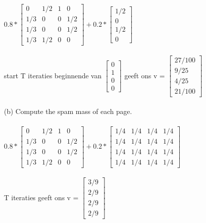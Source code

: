 \documentclass{exam}
\begin{document}
\begin{questions}
$0.8 *  \begin{bmatrix}0 & 1/2 & 1 & 0 \\ 
1/3 & 0 & 0 & 1/2 \\ 
1/3 & 0 & 0 & 1/2 \\ 
1/3 & 1/2 & 0 & 0 \end{bmatrix} + 0.2*\begin{bmatrix} 1/2 \\ 
0 \\ 
1/2 \\
0 \end{bmatrix}$\\\\
start T iteraties beginnende van $\begin{bmatrix} 0 \\ 
1 \\ 
0 \\
0 \end{bmatrix}$ geeft ons v = $\begin{bmatrix}  27/100 \\ 9/25 \\ 4/25 \\ 21/100 \end{bmatrix}$\\\\

(b) Compute the spam mass of each page.\\\\

$0.8 *  \begin{bmatrix}0 & 1/2 & 1 & 0 \\ 
1/3 & 0 & 0 & 1/2 \\ 
1/3 & 0 & 0 & 1/2 \\ 
1/3 & 1/2 & 0 & 0 \end{bmatrix} + 0.2* \begin{bmatrix}1/4 & 1/4 & 1/4 & 1/4 \\ 
1/4 & 1/4 & 1/4 & 1/4 \\ 
1/4 & 1/4 & 1/4 & 1/4 \\ 
1/4 & 1/4 & 1/4 & 1/4 \end{bmatrix}$\\\\
T iteraties geeft ons v = $\begin{bmatrix}  3/9 \\ 2/9 \\ 2/9\\ 2/9\end{bmatrix}$\\\\


\end{questions}
\end{document}
